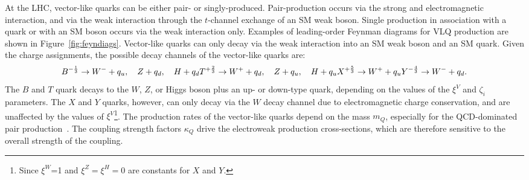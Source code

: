 At the LHC, vector-like quarks can be either pair- or singly-produced. Pair-production occurs via the strong and electromagnetic interaction, and via the weak interaction through the $t$-channel exchange of an SM weak boson. Single production in association with a quark or with an SM boson occurs via the weak interaction only. Examples of leading-order Feynman diagrams for VLQ production are shown in Figure~\ref{fig:feyndiags}. Vector-like quarks can only decay via the weak interaction into an SM weak boson and an SM quark. Given the charge assignments, the possible decay channels of the vector-like quarks are:
\begin{equation}
    B^{-\frac{1}{3}}\rightarrow W^- + q_u, \quad Z + q_d, \quad H + q_d \\
    T^{+\frac{2}{3}}\rightarrow W^+ + q_d, \quad Z + q_u, \quad H + q_u \\
    X^{+\frac{5}{3}}\rightarrow W^+ + q_u \\
    Y^{-\frac{4}{3}}\rightarrow W^- + q_d .
\end{equation}
The $B$ and $T$ quark decays to the $W$, $Z$, or Higgs boson plus an up- or down-type quark, depending on the values of the $\xi^V$ and $\zeta_i$ parameters. The $X$ and $Y$ quarks, however, can only decay via the $W$ decay channel due to electromagnetic charge conservation, and are unaffected by the values of $\xi^V$\footnote{Since $\xi^W$=1 and $\xi^Z=\xi^H=0$ are constants for $X$ and $Y$.}. The production rates of the vector-like quarks depend on the mass $m_Q$, especially for the QCD-dominated pair production~\cite{Buchkremer_2013}. The coupling strength factors $\kappa_Q$ drive the electroweak production cross-sections, which are therefore sensitive to the overall strength of the coupling.
